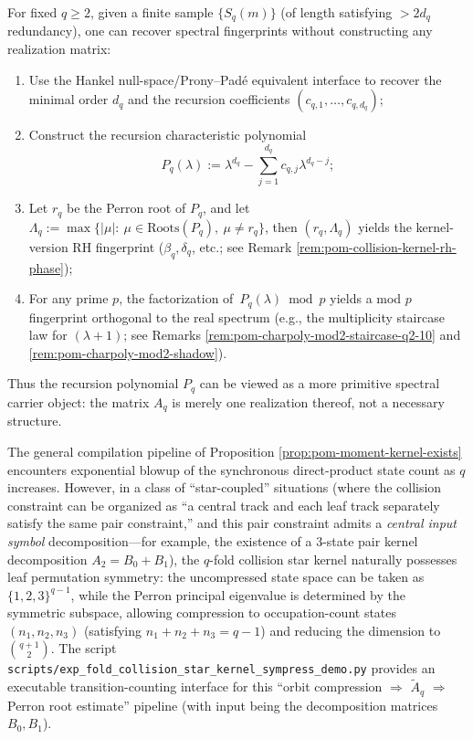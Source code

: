 \begin{algorithm}\label{alg:pom-recurrence-polynomial-spectral-extraction}
For fixed \(q\ge 2\), given a finite sample \(\{S_q(m)\}\) (of length satisfying \(>\!2d_q\) redundancy), one can recover spectral fingerprints without constructing any realization matrix:
\begin{enumerate}
  \item Use the Hankel null-space/Prony--Padé equivalent interface to recover the minimal order \(d_q\) and the recursion coefficients \((c_{q,1},\dots,c_{q,d_q})\);
  \item Construct the recursion characteristic polynomial
  \[
  P_q(\lambda):=\lambda^{d_q}-\sum_{j=1}^{d_q}c_{q,j}\lambda^{d_q-j};
  \]
  \item Let \(r_q\) be the Perron root of \(P_q\), and let
  \(
  \Lambda_q:=\max\{|\mu|:\ \mu\in\mathrm{Roots}(P_q),\ \mu\ne r_q\}
  \),
  then \((r_q,\Lambda_q)\) yields the kernel-version RH fingerprint (\(\beta_q,\delta_q\), etc.; see Remark \ref{rem:pom-collision-kernel-rh-phase});
  \item For any prime \(p\), the factorization of \(\,P_q(\lambda)\bmod p\) yields a mod \(p\) fingerprint orthogonal to the real spectrum (e.g., the multiplicity staircase law for \((\lambda+1)\); see Remarks \ref{rem:pom-charpoly-mod2-staircase-q2-10} and \ref{rem:pom-charpoly-mod2-shadow}).
\end{enumerate}
Thus the recursion polynomial \(P_q\) can be viewed as a more primitive spectral carrier object: the matrix \(A_q\) is merely one realization thereof, not a necessary structure.
\end{algorithm}
\begin{remark}\label{rem:pom-star-sympress}
The general compilation pipeline of Proposition \ref{prop:pom-moment-kernel-exists} encounters exponential blowup of the synchronous direct-product state count as \(q\) increases.
However, in a class of ``star-coupled'' situations (where the collision constraint can be organized as ``a central track and each leaf track separately satisfy the same pair constraint,'' and this pair constraint admits a \emph{central input symbol} decomposition---for example, the existence of a \(3\)-state pair kernel decomposition \(A_2=B_0+B_1\)),
the \(q\)-fold collision star kernel naturally possesses leaf permutation symmetry:
the uncompressed state space can be taken as \(\{1,2,3\}^{q-1}\), while the Perron principal eigenvalue is determined by the symmetric subspace, allowing compression to occupation-count states
\((n_1,n_2,n_3)\) (satisfying \(n_1+n_2+n_3=q-1\)) and reducing the dimension to
\(\binom{q+1}{2}\).
The script \texttt{scripts/exp\_fold\_collision\_star\_kernel\_sympress\_demo.py} provides an executable transition-counting interface for this ``orbit compression \(\Rightarrow\) \(\widetilde A_q\) \(\Rightarrow\) Perron root estimate'' pipeline (with input being the decomposition matrices \(B_0,B_1\)).
\end{remark}

